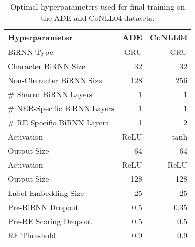 \documentclass{article}
\begin{document}
\begin{table}[t]
\centering
\begin{tabular}{@{}lrr@{}}
\toprule
Hyperparameter & ADE & CoNLL04 \\
\midrule
BiRNN Type & GRU & GRU\\
Character BiRNN Size & 32 & 32\\
Non-Character BiRNN Size & 128 & 256 \\
\# Shared BiRNN Layers & 1 & 1 \\
\# NER-Specific BiRNN Layers & 1 & 1 \\
\# RE-Specific BiRNN Layers & 1 & 2 \\
 Activation & ReLU & tanh \\
 Output Size & 64 & 64 \\
 Activation & ReLU & ReLU \\
 Output Size & 128 & 128 \\
Label Embedding Size & 25 & 25 \\
Pre-BiRNN Dropout & 0.5 & 0.35 \\
Pre-RE Scoring Dropout & 0.5 & 0.5 \\
RE Threshold  & 0.9 & 0.9 \\
\bottomrule
\end{tabular}
\caption{Optimal hyperparameters used for final training on the ADE and CoNLL04 datasets.}
\label{tab:hpyerparameters}
\end{table}
\end{document}
